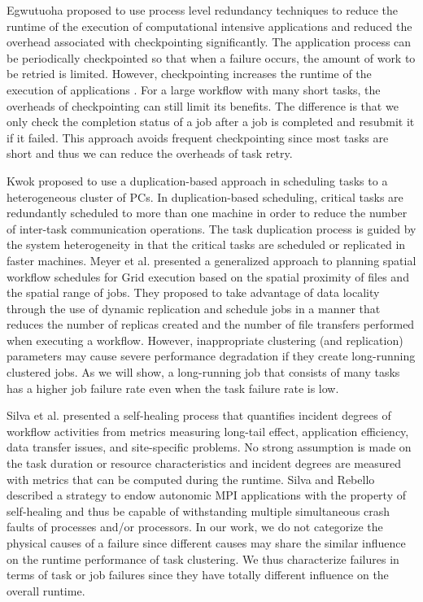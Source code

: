 Egwutuoha \cite{Egwutuoha2012} proposed to use process level redundancy techniques to reduce the runtime of the execution of computational intensive applications and reduced the overhead associated with checkpointing significantly. The application process can be periodically checkpointed so that when a failure occurs, the amount of work to be retried is limited. However, checkpointing increases the runtime of the execution of applications \cite{Zhang2004}. For a large workflow with many short tasks, the overheads of checkpointing can still limit its benefits. The difference is that we only check the completion status of a job after a job is completed and resubmit it if it failed. This approach avoids frequent checkpointing since most tasks are short and thus we can reduce the overheads of task retry. 

Kwok \cite{Kwok2000} proposed to use a duplication-based approach in scheduling tasks to a heterogeneous cluster of PCs. In duplication-based scheduling, critical tasks are redundantly scheduled to more than one machine in order to reduce the number of inter-task communication operations. The task duplication process is guided by the system heterogeneity in that the critical tasks are scheduled or replicated in faster machines. Meyer et al. \cite{Meyer2006} presented a generalized approach to planning spatial workflow schedules for Grid execution based on the spatial proximity of files and the spatial range of jobs. They proposed to take advantage of data locality through the use of dynamic replication and schedule jobs in a manner that reduces the number of replicas created and the number of file transfers performed when executing a workflow. 
However, inappropriate clustering (and replication) parameters may cause severe performance degradation if they create long-running clustered jobs. As we will show, a long-running job that consists of many tasks has a higher job failure rate even when the task failure rate is low.   

Silva et al. \cite{Silva2012} presented a self-healing process that quantifies incident degrees of workflow activities from metrics measuring long-tail effect, application efficiency, data transfer issues, and site-specific problems. No strong assumption is made on the task duration or resource characteristics and incident degrees are measured with metrics that can be computed during the runtime. Silva and Rebello \cite{daSilva2011} described a strategy to endow autonomic MPI applications with the property of self-healing and thus be capable of withstanding multiple simultaneous crash faults of processes and/or processors. In our work, we do not categorize the physical causes of a failure since different causes may share the similar influence on the runtime performance of task clustering.  We thus characterize failures in terms of task or job failures since they have totally different influence on the overall runtime. 

